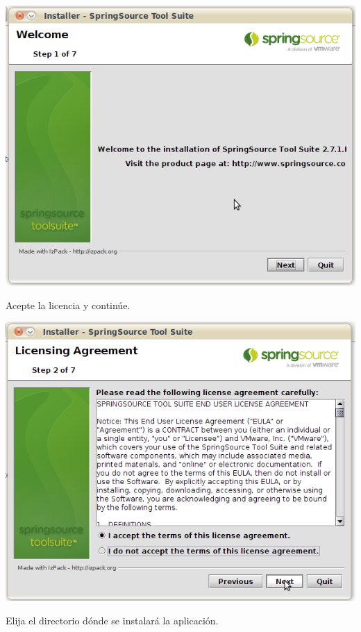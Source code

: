 \documentclass[a4paper,12pt,spanish]{article}
\begin{document}
\begin{center}
\includegraphics[scale=0.5]{ide}
\end{center}

Acepte la licencia y continúe.

\begin{center}
\includegraphics[scale=0.5]{ide2}
\end{center}

Elija el directorio dónde se instalará la aplicación.
\end{document}
